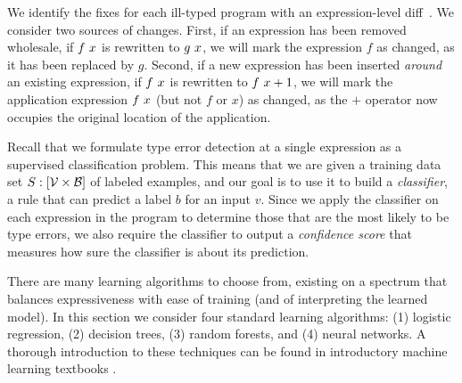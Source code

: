 
We identify the fixes for each ill-typed program with an
expression-level diff~\citep{Lempsink2009-xf}.
%
We consider two sources of changes.
%
First, if an expression has been removed wholesale, \eg if $f\ x$
  is rewritten to $g\ x$, we will mark the expression $f$ as
  changed, as it has been replaced by $g$.
Second, if a new expression has been inserted \emph{around} an existing
  expression, \eg if $f\ x$ is rewritten to
  $f\ x + 1$, we will mark the application expression
  $f\ x$ (but not $f$ or $x$) as changed, as the $+$ operator now
  occupies the original location of the application.

\label{sec:nate:models}
\lstDeleteShortInline{|} %

Recall that we formulate type error detection at a single expression as
a supervised classification problem.
%
This means that we are given a training data set
$S : [\mathcal{V} \times \mathcal{B}]$
of labeled examples, and
our goal is to use it to build a \emph{classifier}, \ie a rule
that can predict a label $b$ for an input $v$.
%
Since we apply the classifier on each expression in the program to
determine those that are the most likely to be type errors, we also
require the classifier to output a \emph{confidence score} that measures
how sure the classifier is about its prediction.


%
%

There are many learning algorithms to choose from, existing on a
spectrum that balances expressiveness with ease of training (and of
interpreting the learned model).
%
In this section we consider four standard learning algorithms: (1)
logistic regression, (2) decision trees, (3) random forests, and (4)
neural networks.
%
A thorough introduction to these techniques can be found in introductory
machine learning textbooks \citep[\eg][]{Hastie2009-bn}.
%


